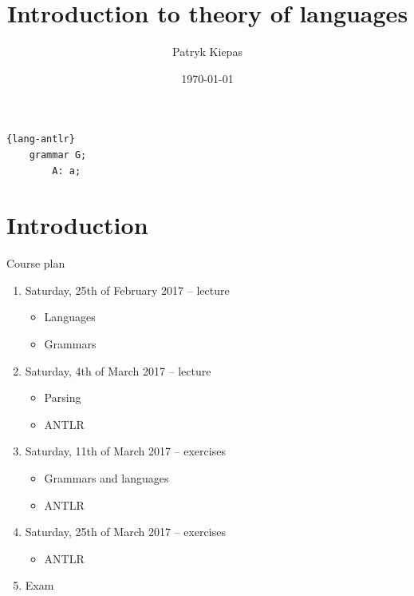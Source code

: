 \documentclass{beamer}
\title[Theory of languages]{Introduction to theory of languages}
\author{Patryk Kiepas}
\institute{MINES ParisTech \\ AGH University Of Science and Technology}
\date{\today}
\begin{document}
\begin{frame}[fragile]
	\begin{lstlisting}{lang-antlr}
	grammar G;
		A: a;
	\end{lstlisting}
\end{frame}

\begin{frame}
  \titlepage
\end{frame}


\section{Introduction}

\begin{frame}{Course plan}

\begin{enumerate}
\item Saturday, 25th of February 2017 -- lecture
\begin{itemize}
\item Languages
\item Grammars
\end{itemize}
\item Saturday, 4th of March 2017 -- lecture
\begin{itemize}
\item Parsing
\item ANTLR
\end{itemize}
\item Saturday, 11th of March 2017 -- exercises
\begin{itemize}
\item Grammars and languages
\item ANTLR
\end{itemize}
\item Saturday, 25th of March 2017 -- exercises
\begin{itemize}
\item ANTLR
\end{itemize}
\item Exam
\end{enumerate}

\end{frame}
\end{document}

